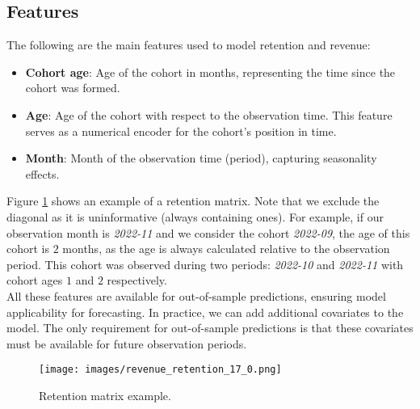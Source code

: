 \documentclass[11pt]{amsart}
\theoremstyle{definition}
\begin{document}
\subsection*{Features}
The following are the main features used to model retention and revenue:
\begin{itemize}
    \item {\bf Cohort age}: Age of the cohort in months, representing the time since the cohort was formed.
    \item {\bf Age}: Age of the cohort with respect to the observation time.
          This feature serves as a numerical encoder for the cohort's position in time.
    \item {\bf Month}: Month of the observation time (period), capturing seasonality effects.
\end{itemize}

Figure \ref{fig:retention_matrix} shows an example of a retention matrix. Note that we exclude the diagonal as it is
uninformative (always containing ones). For example, if our observation month is {\em 2022-11} and we consider the cohort
    {\em 2022-09}, the age of this cohort is $2$ months, as the age is always calculated relative to the observation period.
This cohort was observed during two periods: {\em 2022-10} and {\em 2022-11} with cohort ages $1$ and $2$ respectively.\\

All these features are available for out-of-sample predictions, ensuring model applicability for forecasting.
In practice, we can add additional covariates to the model. The only requirement for out-of-sample predictions is that
these covariates must be available for future observation periods. \\

\begin{figure}
    \centering
    \texttt{[image: images/revenue\_retention\_17\_0.png]}
    \caption{Retention matrix example.}
    \label{fig:retention_matrix}
\end{figure}
\end{document}
